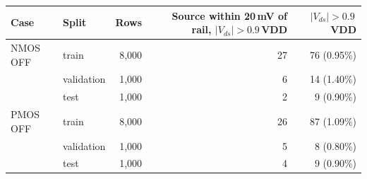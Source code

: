 \begin{tabular}{llrrr}
\toprule
Case & Split & Rows & Source within 20\,mV of rail, $|V_{ds}|>0.9$\,VDD & $|V_{ds}|>0.9$\,VDD \\
\midrule
NMOS OFF & train & 8,000 & 27 & 76 (0.95\%) \\
 & validation & 1,000 & 6 & 14 (1.40\%) \\
 & test & 1,000 & 2 & 9 (0.90\%) \\
\midrule
PMOS OFF & train & 8,000 & 26 & 87 (1.09\%) \\
 & validation & 1,000 & 5 & 8 (0.80\%) \\
 & test & 1,000 & 4 & 9 (0.90\%) \\
\bottomrule
\end{tabular}
